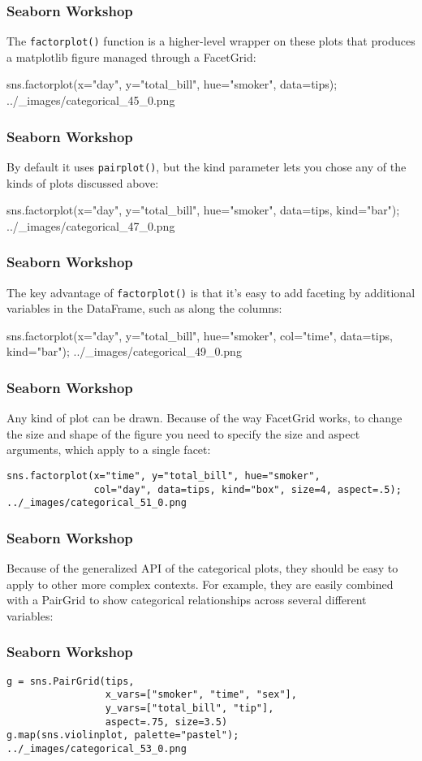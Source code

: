 \begin{frame}[fragile]
	\frametitle{Seaborn Workshop}
	\large
	
The \texttt{factorplot()} function is a higher-level wrapper on these plots that produces a matplotlib figure managed through a FacetGrid:

sns.factorplot(x="day", y="total_bill", hue="smoker", data=tips);
../_images/categorical_45_0.png
\end{frame}
\begin{frame}[fragile]
	\frametitle{Seaborn Workshop}
	\large
	
By default it uses \texttt{pairplot()}, but the kind parameter lets you chose any of the kinds of plots discussed above:

sns.factorplot(x="day", y="total_bill", hue="smoker", data=tips, kind="bar");
../_images/categorical_47_0.png
\end{frame}
\begin{frame}[fragile]
	\frametitle{Seaborn Workshop}
	\large
	
The key advantage of \texttt{factorplot()} is that it’s easy to add faceting by additional variables in the DataFrame, such as along the columns:

sns.factorplot(x="day", y="total_bill", hue="smoker",
               col="time", data=tips, kind="bar");
../_images/categorical_49_0.png
\end{frame}
\begin{frame}[fragile]
	\frametitle{Seaborn Workshop}
	\large
	
Any kind of plot can be drawn. Because of the way FacetGrid works, to change the size and shape of the figure you need to specify the size and aspect arguments, which apply to a single facet:
\begin{verbatim}
sns.factorplot(x="time", y="total_bill", hue="smoker",
               col="day", data=tips, kind="box", size=4, aspect=.5);
../_images/categorical_51_0.png
\end{verbatim}
\end{frame}
\begin{frame}[fragile]
	\frametitle{Seaborn Workshop}
	\large
	
Because of the generalized API of the categorical plots, they should be easy to apply to other more complex contexts. For example, they are easily combined with a PairGrid to show categorical relationships across several different variables:
\end{frame}
\begin{frame}[fragile]
	\frametitle{Seaborn Workshop}
	\large
	\begin{verbatim}
g = sns.PairGrid(tips,
                 x_vars=["smoker", "time", "sex"],
                 y_vars=["total_bill", "tip"],
                 aspect=.75, size=3.5)
g.map(sns.violinplot, palette="pastel");
../_images/categorical_53_0.png
\end{verbatim}
\end{frame}

